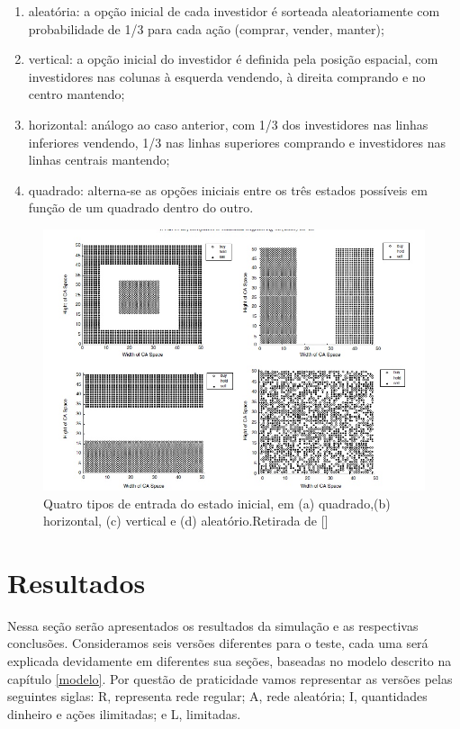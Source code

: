 \documentclass[brazil,ruledheader]{abnt}
\renewcommand{\cite}[1]{[\citeonline{#1}]}
\begin{document}
\begin{enumerate}
 \item aleatória: a opção inicial de cada investidor é sorteada aleatoriamente
com probabilidade de 1/3 para cada ação (comprar, vender, manter);
\item vertical: a opção inicial do investidor é definida pela posição espacial,
com investidores nas colunas à esquerda vendendo, à direita comprando e no
centro mantendo;
\item horizontal: análogo ao caso anterior, com 1/3 dos investidores nas linhas
inferiores vendendo, 1/3 nas linhas superiores comprando e investidores
nas linhas centrais mantendo;
\item quadrado: alterna-se as opções iniciais entre os três estados possíveis em
função de um quadrado dentro do outro.
\end{enumerate}

\begin{figure}[!h]
\centering
\includegraphics[width=0.8\linewidth]{Figuras/entradas.jpg}
 \caption[Quatro tipos de entrada do estado inicial]{Quatro tipos de entrada do
estado inicial, em (a) quadrado,(b) horizontal, (c)
vertical e (d) aleatório.Retirada de \cite{BaHaKhRa10}} 
\end{figure}
\chapter{Resultados}\label{resultados}

Nessa seção serão apresentados os resultados da simulação e as respectivas
conclusões. Consideramos seis versões diferentes para o teste, cada uma será
explicada devidamente em diferentes sua seções,  baseadas no modelo
descrito na
capítulo \ref{modelo}. Por questão de praticidade vamos representar as versões
pelas seguintes siglas: R, representa rede regular; A, rede aleatória; I,
quantidades dinheiro e ações ilimitadas; e L, limitadas. 
\end{document}
